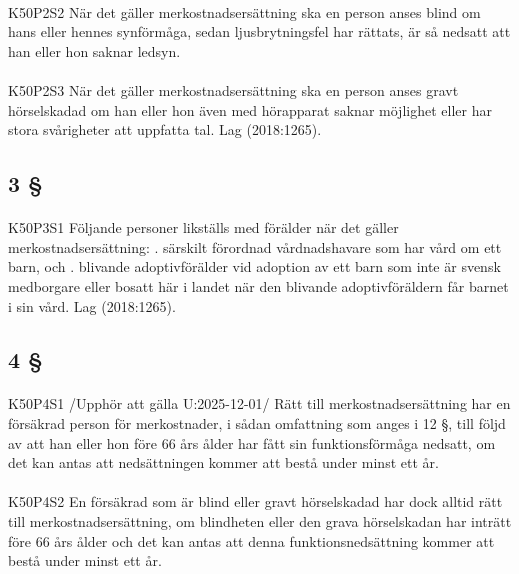 \documentclass[a4paper,notitlepage,openany,10pt]{book}
\begin{document}
\paragraph*{}
{\tiny K50P2S2}
När det gäller merkostnadsersättning ska en person anses blind om hans eller hennes synförmåga, sedan ljusbrytningsfel har rättats, är så nedsatt att han eller hon saknar ledsyn.
\paragraph*{}
{\tiny K50P2S3}
När det gäller merkostnadsersättning ska en person anses gravt hörselskadad om han eller hon även med hörapparat saknar möjlighet eller har stora svårigheter att uppfatta tal.
Lag (2018:1265).
\subsection*{3 §}
\paragraph*{}
{\tiny K50P3S1}
Följande personer likställs med förälder när det gäller merkostnadsersättning:
. särskilt förordnad vårdnadshavare som har vård om ett barn, och
. blivande adoptivförälder vid adoption av ett barn som inte är svensk medborgare eller bosatt här i landet när den blivande adoptivföräldern får barnet i sin vård.
Lag (2018:1265).
\subsection*{4 §}
\paragraph*{}
{\tiny K50P4S1}
/Upphör att gälla U:2025-12-01/
Rätt till merkostnadsersättning har en försäkrad person för merkostnader, i sådan omfattning som anges i 12 §, till följd av att han eller hon före 66 års ålder har fått sin funktionsförmåga nedsatt, om det kan antas att nedsättningen kommer att bestå under minst ett år.
\paragraph*{}
{\tiny K50P4S2}
En försäkrad som är blind eller gravt hörselskadad har dock alltid rätt till merkostnadsersättning, om blindheten eller den grava hörselskadan har inträtt före 66 års ålder och det kan antas att denna funktionsnedsättning kommer att bestå under minst ett år.
\end{document}

